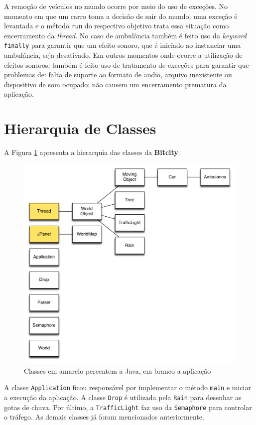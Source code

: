 A remoção de veículos no mundo ocorre por meio do uso de exceções. No
momento em que um carro toma a decisão de sair do mundo, uma exceção é
levantada e o método \verb!run! do respectivo objetivo trata essa
situação como encerramento da \textit{thread}. No caso de ambulância
também é feito uso da \textit{keyword} \verb!finally! para garantir
que um efeito sonoro, que é iniciado ao instanciar uma ambulância,
seja desativado. Em outros momentos onde ocorre a utilização de
efeitos sonoros, também é feito uso de tratamento de exceções para
garantir que problemas de: falta de suporte ao formato de audio,
arquivo inexistente ou dispositivo de som ocupado; não causem um
encerramento prematura da aplicação.

\section{Hierarquia de Classes}

A Figura \ref{hierarchy} apresenta a hierarquia das classes da
\textbf{Bitcity}.

\begin{figure}[ht!]
  \centering
  \includegraphics[scale=0.58]{figs/hierarchy}
  \caption{Classes em amarelo percentem a Java, em branco a aplicação \label{hierarchy}}
\end{figure}

A classe \verb!Application! ficou responsável por implementar o método
\verb!main! e iniciar a execução da aplicação. A classe \verb!Drop! é
utilizada pela \verb!Rain! para desenhar as gotas de chuva. Por
último, a \verb!TrafficLight! faz uso da \verb!Semaphore! para
controlar o tráfego. As demais classes já foram mencionados anteriormente.
